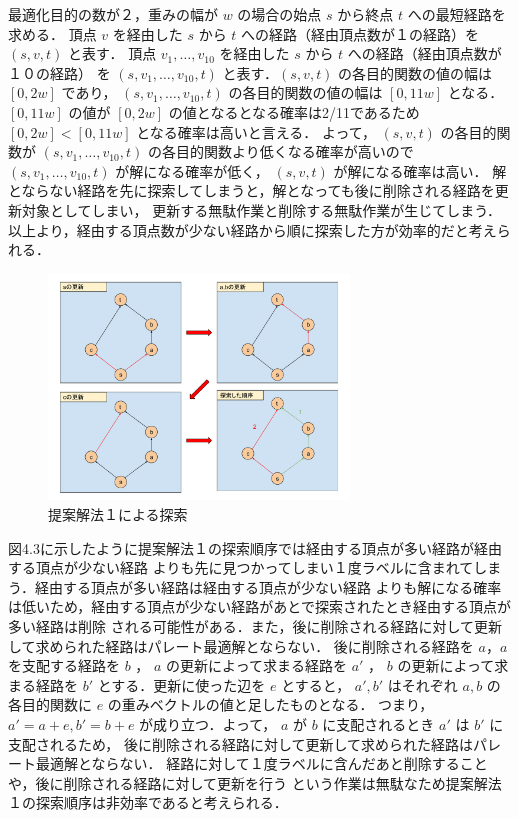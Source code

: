 \documentclass[12pt]{optlab-bachelor}
\begin{document}
最適化目的の数が２，重みの幅が $w$ の場合の始点 $s$ から終点 $t$ への最短経路を求める．
頂点 $v$ を経由した $s$ から $t$ への経路（経由頂点数が１の経路）を $(s,v,t)$ と表す．
頂点 $v_1,\ldots,v_10$ を経由した $s$ から $t$ への経路（経由頂点数が１０の経路）
を $(s,v_1,\ldots,v_10,t)$ と表す．$(s,v,t)$ の各目的関数の値の幅は $[0,2w]$ であり，
 $(s,v_1,\ldots,v_10,t)$ の各目的関数の値の幅は $[0,11w]$ となる．
$[0,11w]$ の値が $[0,2w]$ の値となるとなる確率は2/11であるため $[0,2w]<[0,11w]$ となる確率は高いと言える．
よって， $(s,v,t)$ の各目的関数が $(s,v_1,\ldots,v_10,t)$ の各目的関数より低くなる確率が高いので
 $(s,v_1,\ldots,v_10,t)$ が解になる確率が低く， $(s,v,t)$ が解になる確率は高い．
解とならない経路を先に探索してしまうと，解となっても後に削除される経路を更新対象としてしまい，
更新する無駄作業と削除する無駄作業が生じてしまう．
以上より，経由する頂点数が少ない経路から順に探索した方が効率的だと考えられる．


\begin{figure}[htbp]
  \centering
  \caption{提案解法１による探索}
  \includegraphics[height=6.0cm, width=8.0cm]{fig/fig6.pdf}
\end{figure}

図4.3に示したように提案解法１の探索順序では経由する頂点が多い経路が経由する頂点が少ない経路
よりも先に見つかってしまい１度ラベルに含まれてしまう．経由する頂点が多い経路は経由する頂点が少ない経路
よりも解になる確率は低いため，経由する頂点が少ない経路があとで探索されたとき経由する頂点が多い経路は削除
される可能性がある．また，後に削除される経路に対して更新して求められた経路はパレート最適解とならない．
後に削除される経路を $a$，$a$ を支配する経路を $b$ ， $a$ の更新によって求まる経路を $a'$ ， $b$ の更新によって求まる経路を $b'$
とする．更新に使った辺を $e$ とすると， $a',b'$ はそれぞれ $a,b$ の各目的関数に $e$ の重みベクトルの値と足したものとなる．
つまり， $a'=a+e,b'=b+e$ が成り立つ．よって， $a$ が $b$ に支配されるとき $a'$ は $b'$ に支配されるため，
後に削除される経路に対して更新して求められた経路はパレート最適解とならない．
経路に対して１度ラベルに含んだあと削除することや，後に削除される経路に対して更新を行う
という作業は無駄なため提案解法１の探索順序は非効率であると考えられる．
\end{document}
